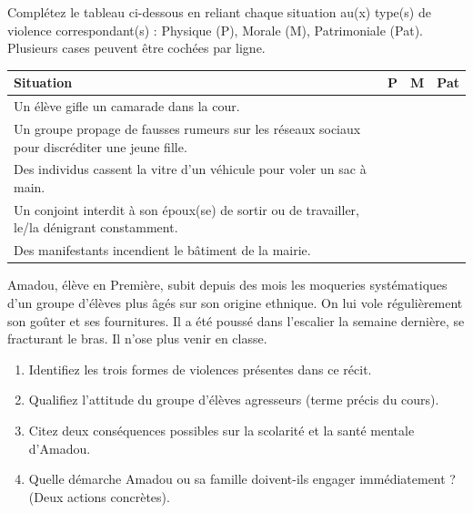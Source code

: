 \documentclass[11pt]{article}
\begin{document}
\begin{exercice}
Complétez le tableau ci-dessous en reliant chaque situation au(x) type(s) de violence correspondant(s) : Physique (P), Morale (M), Patrimoniale (Pat). Plusieurs cases peuvent être cochées par ligne.

\begin{tabular}{|p{5cm}|c|c|c|}
\hline
\textbf{Situation} & \textbf{P} & \textbf{M} & \textbf{Pat} \\
\hline
Un élève gifle un camarade dans la cour. & & & \\
\hline
Un groupe propage de fausses rumeurs sur les réseaux sociaux pour discréditer une jeune fille. & & & \\
\hline
Des individus cassent la vitre d'un véhicule pour voler un sac à main. & & & \\
\hline
Un conjoint interdit à son époux(se) de sortir ou de travailler, le/la dénigrant constamment. & & & \\
\hline
Des manifestants incendient le bâtiment de la mairie. & & & \\
\hline
\end{tabular}
\end{exercice}

\begin{exercice}
Amadou, élève en Première, subit depuis des mois les moqueries systématiques d'un groupe d'élèves plus âgés sur son origine ethnique. On lui vole régulièrement son goûter et ses fournitures. Il a été poussé dans l'escalier la semaine dernière, se fracturant le bras. Il n'ose plus venir en classe.
\begin{enumerate}
    \item Identifiez les trois formes de violences présentes dans ce récit.
    \item Qualifiez l'attitude du groupe d'élèves agresseurs (terme précis du cours).
    \item Citez deux conséquences possibles sur la scolarité et la santé mentale d'Amadou.
    \item Quelle démarche Amadou ou sa famille doivent-ils engager immédiatement ? (Deux actions concrètes).
\end{enumerate}
\end{exercice}
\end{document}
